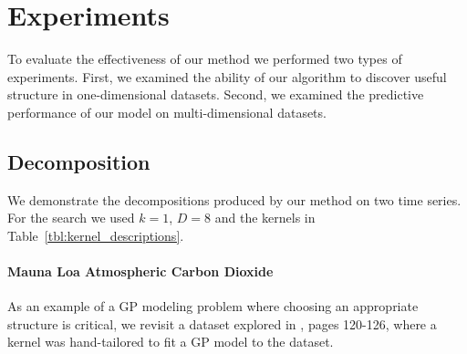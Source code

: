 \documentclass[twoside]{article}
\begin{document}

\section{Experiments}

To evaluate the effectiveness of our method we performed two types of experiments.
First, we examined the ability of our algorithm to discover useful structure in one-dimensional datasets.  Second, we examined the predictive performance of our model on multi-dimensional datasets.

\subsection{Decomposition}

We demonstrate the decompositions produced by our method on two time series.
For the search we used $k = 1$, $D = 8$ and the kernels in Table~\ref{tbl:kernel_descriptions}.



\paragraph{Mauna Loa Atmospheric Carbon Dioxide}

As an example of a GP modeling problem where choosing an appropriate structure is critical, we revisit a dataset explored in \cite{rasmussen38gaussian}, pages 120-126, where a kernel was hand-tailored to fit a GP model to the dataset.
\end{document}
